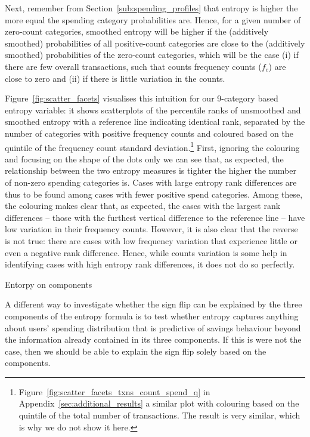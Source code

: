 Next, remember from Section~\ref{sub:spending_profiles} that entropy is higher
the more equal the spending category probabilities are. Hence, for a given
number of zero-count categories, smoothed entropy will be higher if the
(additively smoothed) probabilities of all positive-count categories are close
to the (additively smoothed) probabilities of the zero-count categories, which
will be the case (i) if there are few overall transactions, such that counts
frequency counts ($f_c$) are close to zero and (ii) if there is little
variation in the counts.

Figure~\ref{fig:scatter_facets} visualises this intuition for our 9-category
based entropy variable: it shows scatterplots of the percentile ranks of
unsmoothed and smoothed entropy with a reference line indicating identical
rank, separated by the number of categories with positive frequency counts and
coloured based on the quintile of the frequency count standard
deviation.\footnote{Figure~\ref{fig:scatter_facets_txns_count_spend_q} in
    Appendix~\ref{sec:additional_results} a similar plot with colouring based on the
quintile of the total number of transactions. The result is very similar, which
is why we do not show it here.} First, ignoring the colouring and focusing on
the shape of the dots only we can see that, as expected, the relationship
between the two entropy measures is tighter the higher the number of non-zero
spending categories is. Cases with large entropy rank differences are thus to
be found among cases with fewer positive spend categories. Among these, the
colouring makes clear that, as expected, the cases with the largest rank
differences -- those with the furthest vertical difference to the reference
line -- have low variation in their frequency counts. However, it is also clear
that the reverse is not true: there are cases with low frequency variation that
experience little or even a negative rank difference. Hence, while counts
variation is some help in identifying cases with high entropy rank differences,
it does not do so perfectly.

\begin{table}[ht]
\centering\tiny
\caption{Entorpy on components}
\label{tab:entropy_on_components}

\end{table}

A different way to investigate whether the sign flip can be explained by the
three components of the entropy formula is to test whether entropy captures
anything about users' spending distribution that is predictive of savings
behaviour beyond the information already contained in its three components. If
this is were not the case, then we should be able to explain the sign flip
solely based on the components.

